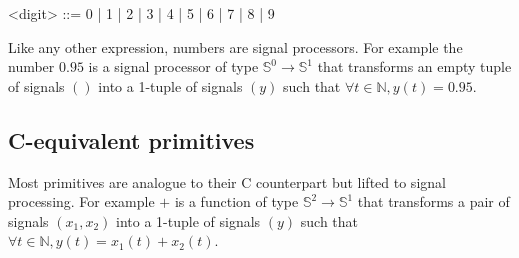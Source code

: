 \documentclass[a4paper]{book}
\begin{document}
\begin{grammar}
  <digit> ::= 
  0 | 1 | 2 | 3 | 4 | 5 | 6 | 7 | 8 | 9
\end{grammar}


\bigskip

Like any other \faust expression, numbers are signal processors. For example the number $0.95$ is a signal processor of type $\mathbb{S}^{0}\rightarrow\mathbb{S}^{1}$ that transforms an empty tuple of signals $()$ into a 1-tuple of signals $(y)$ such that $\forall t\in\mathbb{N}, y(t)=0.95$.



\subsection{C-equivalent primitives}

Most \faust primitives are analogue to their C counterpart but lifted to signal processing.
For example $+$ is a function of type $\mathbb{S}^{2}\rightarrow\mathbb{S}^{1}$ that transforms a pair of signals $(x_1,x_2)$ into a 1-tuple of signals $(y)$ such that $\forall t\in\mathbb{N}, y(t)=x_{1}(t)+x_{2}(t)$.

\bigskip
\end{document}
